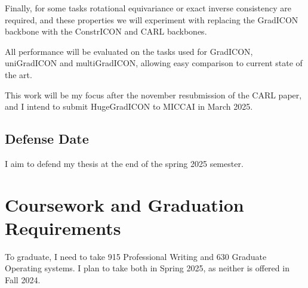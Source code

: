 \documentclass{article}
\begin{document}
Finally, for some tasks rotational equivariance or exact inverse consistency are required, and these properties
we will experiment with replacing the GradICON backbone with the ConstrICON and CARL backbones.

All performance will be evaluated on the tasks used for GradICON, uniGradICON and multiGradICON, allowing easy comparison to current state of the art.

This work will be my focus after the november resubmission of the CARL paper, and I intend to submit HugeGradICON to MICCAI in March 2025.

\subsection{Defense Date}

I aim to defend my thesis at the end of the spring 2025 semester.

\section{Coursework and Graduation Requirements}
To graduate, I need to take 915 Professional Writing and 630 Graduate Operating systems. I plan to take both in Spring 2025, as neither is offered in Fall 2024.



\end{document}
